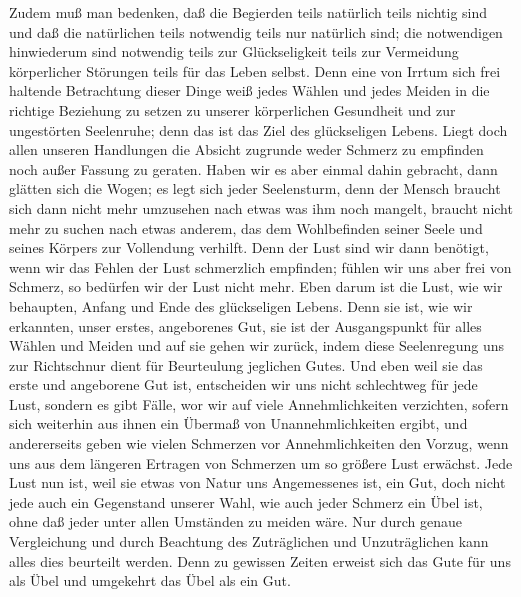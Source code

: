 \documentclass{stex}
\begin{document}
Zudem muß man bedenken, daß die Begierden teils natürlich teils nichtig sind und daß die natürlichen teils notwendig teils nur natürlich sind; die notwendigen hinwiederum sind notwendig teils zur Glückseligkeit teils zur Vermeidung körperlicher Störungen teils für das Leben selbst.
Denn eine von Irrtum sich frei haltende Betrachtung dieser Dinge weiß jedes Wählen und jedes Meiden in die richtige Beziehung zu setzen zu unserer körperlichen Gesundheit und zur ungestörten Seelenruhe; denn das ist das Ziel des glückseligen Lebens.
Liegt doch allen unseren Handlungen die Absicht zugrunde weder Schmerz zu empfinden noch außer Fassung zu geraten.
Haben wir es aber einmal dahin gebracht, dann glätten sich die Wogen; es legt sich jeder Seelensturm, denn der Mensch braucht sich dann nicht mehr umzusehen nach etwas was ihm noch mangelt, braucht nicht mehr zu suchen nach etwas anderem, das dem Wohlbefinden seiner Seele und seines Körpers zur Vollendung verhilft.
Denn der Lust sind wir dann benötigt, wenn wir das Fehlen der Lust schmerzlich empfinden; fühlen wir uns aber frei von Schmerz, so bedürfen wir der Lust nicht mehr.
Eben darum ist die Lust, wie wir behaupten, Anfang und Ende des glückseligen Lebens.
Denn sie ist, wie wir erkannten, unser erstes, angeborenes Gut, sie ist der Ausgangspunkt für alles Wählen und Meiden und auf sie gehen wir zurück, indem diese Seelenregung uns zur Richtschnur dient für Beurteulung jeglichen Gutes.
Und eben weil sie das erste und angeborene Gut ist, entscheiden wir uns nicht schlechtweg für jede Lust, sondern es gibt Fälle, wor wir auf viele Annehmlichkeiten verzichten, sofern sich weiterhin aus ihnen ein Übermaß von Unannehmlichkeiten ergibt, und andererseits geben wie vielen Schmerzen vor Annehmlichkeiten den Vorzug, wenn uns aus dem längeren Ertragen von Schmerzen um so größere Lust erwächst.
Jede Lust nun ist, weil sie etwas von Natur uns Angemessenes ist, ein Gut, doch nicht jede auch ein Gegenstand unserer Wahl, wie auch jeder Schmerz ein Übel ist, ohne daß jeder unter allen Umständen zu meiden wäre.
Nur durch genaue Vergleichung und durch Beachtung des Zuträglichen und Unzuträglichen kann alles dies beurteilt werden.
Denn zu gewissen Zeiten erweist sich das Gute für uns als Übel und umgekehrt das Übel als ein Gut.
\end{document}
